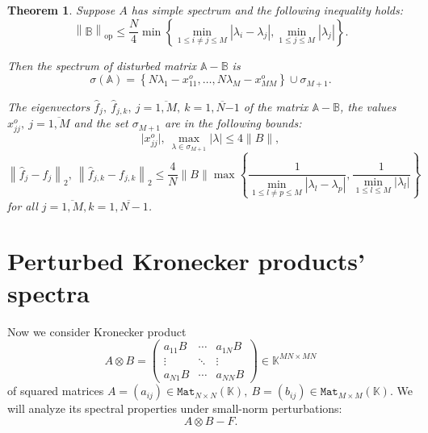 \documentclass[14pt,a4paper]{extarticle}
\newtheorem{thm}{Theorem}
\theoremstyle{definition}
\begin{document}
\begin{thm}\label{nk:thm:tiled}
Suppose \( A \) has simple spectrum and the following inequality holds:
\[
    \left\| \mathbb{B} \right\|_{\mathrm{op}}
        \leq 
        \frac{N}{4}
         \min\left\{
             \min\limits_{1\leq i{\neq}j \leq M }{|\lambda_i - \lambda_j|},
             \min\limits_{1\leq j \leq M}{|\lambda_j|}
         \right\}.
 \]

Then the spectrum of disturbed matrix \( \mathbb{A} - \mathbb{B} \) is
\[
    \sigma\left(\mathbb{A}\right) =
        \left\{
            N\lambda_1 - x_{11}^o, \ldots, N\lambda_M - x_{MM}^o
        \right\}
    \cup \sigma_{M{+}1}.
\]

The eigenvectors
    \( \hat{f}_j,\ \hat{f}_{j,k},\ j{=}\overline{1,M},\ k{=}\overline{1,N{-1}} \)
    of the matrix \( \mathbb{A}{-}\mathbb{B} \),
    the values \( x_{jj}^o,\ j{=}\overline{1,M} \)
    and the set \( \sigma_{M{+}1} \) are in the following bounds:
\[
    \lvert x_{jj}^o\rvert,
    \ \max_{\lambda\in\sigma_{M{+}1}} \lvert\lambda\rvert
    \leq 4\|B\|,
\]
\[
    \left\| \hat{f}_j - f_j \right\|_2,
    \ \left\| \hat{f}_{j,k} - f_{j,k}\right\|_2
    \leq
    \frac4N \|B\|
         \max\left\{
         \frac{1}{
             \min\limits_{1\leq l{\neq}p \leq M }{|\lambda_l - \lambda_p|}},
         \frac{1}{
             \min\limits_{1\leq l \leq M}{|\lambda_l|}}
         \right\}
\]
for all \( j{=}\overline{1,M}, k{=}\overline{1,N-1} \).
\end{thm}

\section{Perturbed Kronecker products' spectra}

Now we consider Kronecker product
\[
    A\otimes B =
    \begin{pmatrix}
        a_{11} B & \cdots & a_{1N} B \\
        \vdots   & \ddots & \vdots \\
        a_{N1} B & \cdots & a_{NN} B
    \end{pmatrix}
    \in \mathbb{K}^{{MN}{\times}{MN}}
\]
of squared matrices
\( A={(a_{ij})}\in\mathtt{Mat}_{N{\times}N}(\mathbb{K}),
 \ B={(b_{ij})}\in\mathtt{Mat}_{M{\times}M}(\mathbb{K}). \)
We will analyze its spectral properties
    under small-norm perturbations:
\begin{equation}\label{-kronperturb}
    A\otimes B - F.
\end{equation}
\end{document}
